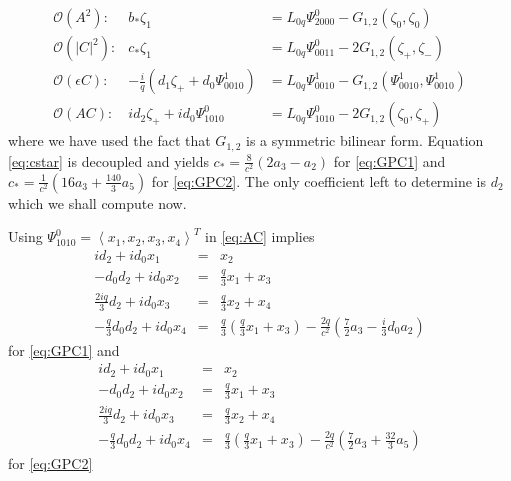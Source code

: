 \begin{subequations}
\begin{eqnarray}
\mathcal{O}(A^2): &		b_* \zeta_1 &= L_{0q} \Psi_{2000}^0 - G_{1,2}(\zeta_0,\zeta_0) \\
\mathcal{O}(\left|C\right|^2):&	c_* \zeta_1 &= L_{0q} \Psi_{0011}^0 -2 G_{1,2}(\zeta_+,\zeta_-) \label{eq:cstar} \\
\mathcal{O}(\epsilon C): &-\frac{i}{q} \left(d_1 \zeta_+ +  d_0 \Psi_{0010}^1\right) &= L_{0q} \Psi_{0010}^1 - G_{1,2}(\Psi_{0010}^1,\Psi_{0010}^1) \\
\mathcal{O}(A C): 	&i d_2 \zeta_+ + i d_0 \Psi_{1010}^0 &= L_{0q} \Psi_{1010}^0 - 2 G_{1,2}(\zeta_0,\zeta_+)  \label{eq:AC}
\end{eqnarray}
\end{subequations}
where we have used the fact that $G_{1,2}$ is a symmetric bilinear form. Equation \eqref{eq:cstar} is decoupled and yields 
$ c_* = \frac{8}{c^2}\left( 2 a_3 - a_2 \right)$ for \eqref{eq:GPC1} and 
$ c_* = \frac{1}{c^2}\left( 16 a_3 + \frac{140}{3} a_5 \right)$ for \eqref{eq:GPC2}. The only coefficient left to determine is $d_2$ which we shall compute now. 

Using $\Psi_{1010}^0 = \left<x_1,x_2,x_3,x_4\right>^T$ in \eqref{eq:AC} implies 
\begin{subequations}
\begin{eqnarray}
i d_2 + i d_0 x_1 &=& x_2 \label{eq:one} \\
- d_0 d_2 + i d_0 x_2 &=& \frac{q}{3} x_1 + x_3 \label{eq:two} \\
\frac{2 i q}{3} d_2 + i d_0 x_3 &=& \frac{q}{3} x_2 + x_4  \label{eq:three} \\
- \frac{q}{3} d_0 d_2 + i d_0 x_4 &=& \frac{q}{3}\left(\frac{q}{3} x_1 + x_3 \right) - \frac{ 2 q}{c^2}\left(\frac{7}{2} a_3 - \frac{i}{3} d_0 a_2\right) \label{eq:four}
\end{eqnarray}
\end{subequations}
for \eqref{eq:GPC1} and
\begin{subequations}
\begin{eqnarray}
i d_2 + i d_0 x_1 &=& x_2 \label{eq:one} \\
- d_0 d_2 + i d_0 x_2 &=& \frac{q}{3} x_1 + x_3 \label{eq:two} \\
\frac{2 i q}{3} d_2 + i d_0 x_3 &=& \frac{q}{3} x_2 + x_4  \label{eq:three} \\
- \frac{q}{3} d_0 d_2 + i d_0 x_4 &=& \frac{q}{3}\left(\frac{q}{3} x_1 + x_3 \right) - \frac{2 q}{c^2}\left( \frac{7}{2} a_3 + \frac{32}{3} a_5\right) \label{eq:four}
\end{eqnarray}
\end{subequations}
for \eqref{eq:GPC2}

